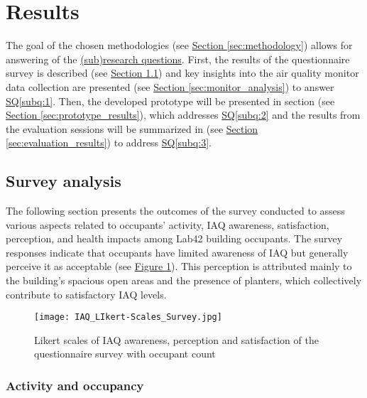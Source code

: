 \section{Results}
\label{sec:results}

The goal of the chosen methodologies (see \hyperref[sec:methodology]{Section \ref*{sec:methodology}}) allows for answering of the \hyperref[rq:1]{(sub)research questions}. First, the results of the questionnaire survey is described (see \hyperref[sec:survey_analysis]{Section \ref*{sec:survey_analysis}}) and key insights into the air quality monitor data collection are presented (see \hyperref[sec:monitor_analysis] {Section \ref*{sec:monitor_analysis}}) to answer \hyperref[subq:1]{SQ\ref*{subq:1}}. Then, the developed prototype will be presented in section (see \hyperref[sec:prototype_results]{Section \ref*{sec:prototype_results}}), which addresses \hyperref[subq:2]{SQ\ref*{subq:2}} and the results from the evaluation sessions will be summarized in (see \hyperref[sec:evaluation_results]{Section \ref*{sec:evaluation_results}}) to address \hyperref[subq:3]{SQ\ref*{subq:3}}.

\subsection{Survey analysis}
\label{sec:survey_analysis}

The following section presents the outcomes of the survey conducted to assess various aspects related to occupants' activity, IAQ awareness, satisfaction, perception, and health impacts among Lab42 building occupants. The survey responses indicate that occupants have limited awareness of IAQ but generally perceive it as acceptable (see \hyperref[fig:likert-scales-survey]{Figure \ref*{fig:likert-scales-survey}}). This perception is attributed mainly to the building's spacious open areas and the presence of planters, which collectively contribute to satisfactory IAQ levels.

\begin{figure}[H]
    \centering
    \texttt{[image: IAQ\_LIkert-Scales\_Survey.jpg]}
    \caption{Likert scales of IAQ awareness, perception and satisfaction of the questionnaire survey with occupant count}
    \label{fig:likert-scales-survey}
\end{figure}

\subsubsection{Activity and occupancy}

